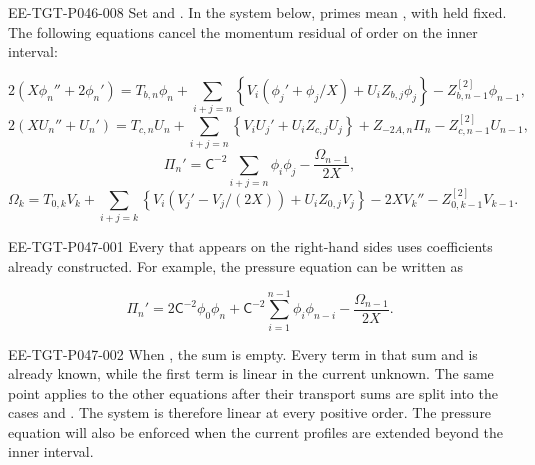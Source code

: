 \begin{EESegment}{EE-TGT-P046-008}
Set  and . In the system below,
primes mean , with
 held fixed. The following equations cancel the momentum residual of
order  on the inner interval:
\end{EESegment}
\begin{equation}
\label{eq:5.3}
2(X\phi_n''+2\phi_n')
=T_{b,n}\phi_n
+\sum_{i+j=n}\left\{V_i(\phi_j'+\phi_j/X)+U_iZ_{b,j}\phi_j\right\}
-Z_{b,n-1}^{[2]}\phi_{n-1},
\tag{5.3}
\end{equation}
\begin{equation}
\label{eq:5.4}
2(XU_n''+U_n')
=T_{c,n}U_n
+\sum_{i+j=n}\left\{V_iU_j'+U_iZ_{c,j}U_j\right\}
+Z_{-2A,n}\Pi_n-Z_{c,n-1}^{[2]}U_{n-1},
\tag{5.4}
\end{equation}
\begin{equation}
\label{eq:5.5}
\Pi_n'=\mathsf C^{-2}\sum_{i+j=n}\phi_i\phi_j-\frac{\Omega_{n-1}}{2X},
\tag{5.5}
\end{equation}
\begin{equation}
\label{eq:5.6}
\Omega_k=T_{0,k}V_k
+\sum_{i+j=k}\left\{V_i(V_j'-V_j/(2X))+U_iZ_{0,j}V_j\right\}
-2XV_k''-Z_{0,k-1}^{[2]}V_{k-1}.
\tag{5.6}
\end{equation}
%
\begin{EESegment}{EE-TGT-P047-001}
Every  that appears on the
right-hand sides uses coefficients already constructed. For example, the pressure equation can be
written as
\end{EESegment}
\[
\Pi_n'=2\mathsf C^{-2}\phi_0\phi_n
+\mathsf C^{-2}\sum_{i=1}^{n-1}\phi_i\phi_{n-i}
-\frac{\Omega_{n-1}}{2X}.
\]
\begin{EESegment}{EE-TGT-P047-002}
When , the sum is empty. Every term in that sum and
 is already known, while the first term is linear in the current
unknown. The same point applies to the other equations after their transport sums are split into
the cases  and
. The system is therefore linear at every positive order. The
pressure equation will also be enforced when the current profiles are extended beyond the inner
interval.
\end{EESegment}

